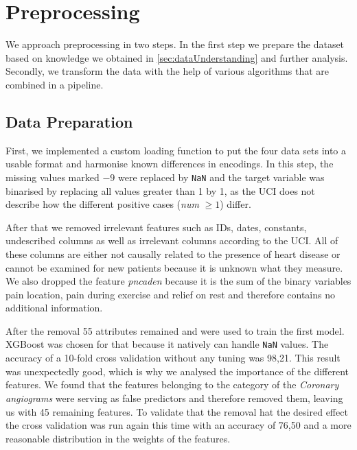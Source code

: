 




\section{Preprocessing} \label{sec:preprocessing}

We approach preprocessing in two steps. In the first step we prepare the dataset based on knowledge we obtained in \cref{sec:dataUnderstanding} and further analysis. 
Secondly, we transform the data with the help of various algorithms that are combined in a pipeline. 

\subsection{Data Preparation }
First, we implemented a custom loading function to put the four data sets into a usable format and harmonise known differences in encodings. In this step, the missing values marked $-9$ were replaced by \texttt{NaN} and the target variable was binarised by replacing all values greater than 1 by 1, as the UCI does not describe how the different positive cases (\textit{num} $\geq 1$) differ.

After that we removed irrelevant features such as IDs, dates, constants, undescribed columns as well as irrelevant columns according to the UCI. All of these columns are either not causally related to the presence of heart disease or cannot be examined for new patients because it is unknown what they measure. We also dropped the feature \textit{pncaden} because it is the sum of the binary variables  pain location, pain during exercise and relief on rest and therefore contains no additional information. 

After the removal 55 attributes remained and were used to train the first model. XGBoost was chosen for that because it natively can handle \texttt{NaN} values. The accuracy of a 10-fold cross validation without any tuning was 98,21. This result was unexpectedly good, which is why we analysed the importance of the different features. We found that the features belonging to the category of the \textit{Coronary angiograms} were serving as false predictors and therefore removed them, leaving us with 45 remaining features. To validate that the removal hat the desired effect the cross validation was run again this time with an accuracy of 76,50 and a more reasonable distribution in the weights of the features.   

